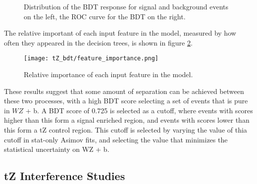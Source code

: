 \begin{figure}[H] 
\center
    \caption{Distribution of the BDT response for signal and background events on the left, the ROC curve for the BDT on the right.}
    \label{fig:tZ_bdt}
\end{figure}

The relative important of each input feature in the model, measured by how often they appeared in the decision trees, is shown in figure \ref{fig:tZ_fImp}.

\begin{figure}[H] 
\center
        \texttt{[image: tZ\_bdt/feature\_importance.png]}
        \caption{Relative importance of each input feature in the model.}
        \label{fig:tZ_fImp}
\end{figure}

These results suggest that some amount of separation can be achieved between these two processes, with a high BDT score selecting a set of events that is pure in $WZ$ + b. A BDT score of 0.725 is selected as a cutoff, where events with scores higher than this form a signal enriched region, and events with scores lower than this form a tZ control region. This cutoff is selected by varying the value of thia cutoff in stat-only Asimov fits, and selecting the value that minimizes the statistical uncertainty on WZ + b.

\subsection{tZ Interference Studies}
\label{sec:tZInt}

